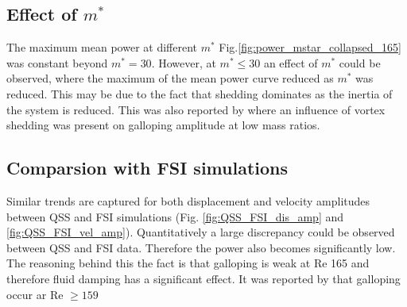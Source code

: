   
  


\subsection{Effect of $m^*$}


The maximum mean power at different  $m^*$ Fig.\ref{fig:power_mstar_collapsed_165} was constant beyond $m^*=30$. However, at $m^* \leq 30$ an effect of $m^*$ could be observed, where the maximum of the mean power curve reduced as $m^*$ was reduced. This may be due to the fact that shedding dominates as the inertia of the system is reduced. This was also reported by \cite{Joly2012} where an influence of vortex shedding was present on galloping amplitude at low mass ratios. 


\subsection{Comparsion with FSI simulations}
 Similar trends are captured for both displacement and velocity amplitudes between QSS and FSI simulations (Fig. \ref{fig:QSS_FSI_dis_amp} and \ref{fig:QSS_FSI_vel_amp}). Quantitatively a large discrepancy  could be observed between QSS and FSI data. Therefore the power also becomes significantly low. The reasoning behind this the fact is that galloping is weak at Re 165 and therefore fluid damping has a significant effect. It was reported by \cite{Barrero-Gil2009} that galloping occur ar Re $\geq 159$
 











 

 
 
 

 
 



 
 
 
 
 
 
 
 
 
 
  
 
 